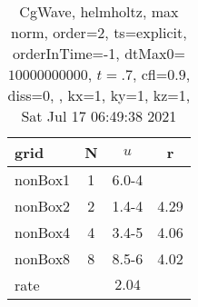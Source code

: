 \begin{table}[H]\tableFont %
\begin{center}
\begin{tabular}{|l|c|c|c|} \hline 
grid  & N &  $ u $ & r \\ \hline 
   nonBox1 &     1 & \num{6.0}{-4} &        \\ \hline
   nonBox2 &     2 & \num{1.4}{-4} &  4.29  \\ \hline
   nonBox4 &     4 & \num{3.4}{-5} &  4.06  \\ \hline
   nonBox8 &     8 & \num{8.5}{-6} &  4.02  \\ \hline
    rate             &       &  $2.04$       &       \\ \hline
\end{tabular}
\caption{CgWave, helmholtz, max norm, order=$2$, ts=explicit, orderInTime=-1, dtMax0=$10000000000$, $t=.7$, cfl=$0.9$, diss=$0$, , kx=1, ky=1, kz=1, Sat Jul 17 06:49:38 2021}\label{table:helmholtzOrder2max}
\end{center}
\end{table}
